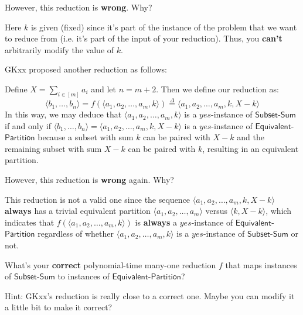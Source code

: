 \begin{parts}
\begin{subparts}
        However, this reduction is \textbf{wrong}. Why?
        \begin{solution}
        
            Here $k$ is given (fixed) since it's part of the instance of the problem that we want to reduce from (i.e. it's part of the input of your reduction). Thus, you \textbf{can't} arbitrarily modify the value of $k$.
        \end{solution}

        \newpage
        
        \subpart [0] GKxx proposed another reduction as follows: 
        
        Define $X = \sum_{i\in [m]} a_i$ and let $n = m +2$. Then we define our reduction as:
        $$\langle{b_1, \ldots, b_{n}\rangle} = f(\langle{a_1, a_2, \ldots, a_m, k\rangle}) \overset{\Delta}{=} \langle{a_1, a_2, \ldots, a_m, k, X - k\rangle}$$
        In this way, we may deduce that $\langle{a_1, a_2, \ldots, a_m, k\rangle}$ is a $yes$-instance of $\mathsf{Subset \text{-} Sum}$ if and only if $\langle{b_1, \ldots, b_{n}\rangle} = \langle{a_1, a_2, \ldots, a_m, k, X - k\rangle}$ is a $yes$-instance of $\mathsf{Equivalent}$-$\mathsf{Partition}$ because a subset with sum $k$ can be paired with $X - k$ and the remaining subset with sum $X - k$ can be paired with $k$, resulting in an equivalent partition.

        However, this reduction is \textbf{wrong} again. Why?
        \begin{solution}
        
            This reduction is not a valid one since the sequence $\langle{a_1, a_2, \ldots, a_m, k, X - k\rangle}$ \textbf{always} has a trivial equivalent partition $\langle{a_1, a_2, \ldots, a_m\rangle}$ versus $\langle{k, X - k\rangle}$, which indicates that $f(\langle{a_1, a_2, \ldots, a_m, k\rangle})$ is \textbf{always} a $yes$-instance of $\mathsf{Equivalent}$-$\mathsf{Partition}$ regardless of whether $\langle{a_1, a_2, \ldots, a_m, k\rangle}$ is a $yes$-instance of $\mathsf{Subset \text{-} Sum}$ or not.
        \end{solution}

        \subpart[3] What's your \textbf{correct} {\color{red} polynomial-time many-one reduction} $f$ that maps instances of $\mathsf{Subset \text{-} Sum}$ to instances of $\mathsf{Equivalent \text{-} Partition}$?

        Hint: GKxx's reduction is really close to a correct one. Maybe you can modify it a little bit to make it correct?
        \begin{solution}
        \vspace{4.5in}
        \end{solution}
    \end{subparts}


\end{parts}
